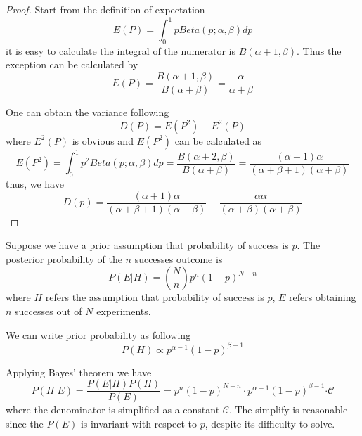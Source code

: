 \documentclass[a4paper]{article}
\begin{document}
\begin{proof}
    Start from the definition of expectation
    \begin{equation*}
        E(P) = \int_{0}^{1} p Beta(p; \alpha, \beta) dp
    \end{equation*}
    it is easy to calculate the integral of the numerator is $B(\alpha+1, \beta)$.
    Thus the exception can be calculated by
    \begin{equation*}
        E(P) = \frac{B(\alpha+1, \beta)}{B(\alpha+\beta)} = \frac{\alpha}{\alpha+\beta}
    \end{equation*}

    One can obtain the variance following
    \begin{equation*}
        D(P) = E(P^{2}) - E^{2}(P)
    \end{equation*}
    where $E^{2}(P)$ is obvious and $E(P^{2})$ can be calculated as
    \begin{equation*}
        E(P^{2}) = \int_{0}^{1} p^{2} Beta(p; \alpha, \beta) dp = \frac{B(\alpha+2, \beta)}{B(\alpha+\beta)} = \frac{(\alpha+1)\alpha}{(\alpha+\beta+1)(\alpha+\beta)}
    \end{equation*}
    thus, we have
    \begin{equation*}
        D(p) = \frac{(\alpha+1)\alpha}{(\alpha+\beta+1)(\alpha+\beta)} - \frac{\alpha\alpha}{(\alpha+\beta)(\alpha+\beta)}
    \end{equation*}

\end{proof}

Suppose we have a prior assumption that probability of success is $p$.
The posterior probability of the $n$ successes outcome is
\begin{equation}
    P(E|H) = \binom{N}{n} p^n (1-p)^{N-n}
\end{equation}
where $H$ refers the assumption that probability of success is $p$, $E$ refers obtaining $n$ successes out of $N$ experiments.

We can write prior probability as following
\begin{equation}
    P(H) \propto p^{\alpha-1} (1-p)^{\beta-1}
    \label{eq: Prior probability}
\end{equation}

Applying Bayes' theorem we have
\begin{equation}
    P(H|E) = \frac{P(E|H) P(H)}{P(E)} = p^n (1-p)^{N-n} \cdot p^{\alpha-1} (1-p)^{\beta-1} \mathcal \cdot \mathcal{C}
\end{equation}
where the denominator is simplified as a constant $\mathcal{C}$. The simplify is reasonable since the $P(E)$ is invariant with respect to $p$, despite its difficulty to solve.
\end{document}
